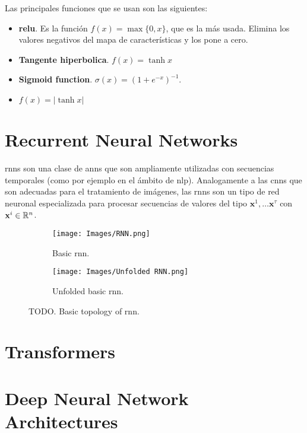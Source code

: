 Las principales funciones que se usan son las siguientes:
\begin{itemize}
  \item \textbf{\gls*{relu}}. Es la función \(f(x) = \max \{0, x\}\), que es la
  más usada. Elimina los valores negativos del mapa de características y los
  pone a cero.
  \item \textbf{Tangente hiperbolica}. \(f(x) = \tanh x\)
  \item \textbf{Sigmoid function}. \(\sigma(x) = {(1 + e^{-x})}^{-1}\).
  \item \(f(x) = |\tanh x|\)
\end{itemize}


\section{Recurrent Neural Networks}
\label{sec:recurr-neur-netw}

\glspl{rnn} son una clase de \glspl{ann} que son ampliamente utilizadas con
secuencias temporales (como por ejemplo en el ámbito de
\gls{nlp}). Analogamente a las \glspl{cnn} que son adecuadas para el tratamiento
de imágenes, las \glspl{rnn} son un tipo de red neuronal especializada para
procesar secuencias de valores del tipo \(\mathbf{x}^1, \ldots
\mathbf{x}^{\tau}\) con \(\mathbf{x}^i \in \mathbb{R}^n\).

\begin{figure}[ht]
  \begin{subfigure}[b]{.25\textwidth}
    \centering
    \texttt{[image: Images/RNN.png]}
    \caption{Basic \gls{rnn}.}
  \end{subfigure}\hfill
  \begin{subfigure}[b]{.75\textwidth}
    \centering
    \texttt{[image: Images/Unfolded RNN.png]}
    \caption{Unfolded basic \gls{rnn}.}
  \end{subfigure}
  \caption[Basic topology of \acrfull{rnn}]{TODO. Basic topology of \acrfull{rnn}.}
\end{figure}


\section{Transformers}
\label{sec:transformers}


\section{Deep Neural Network Architectures}
